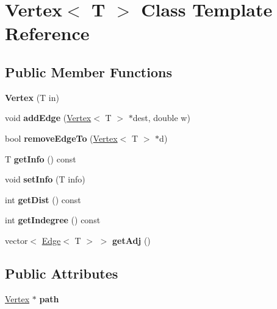 \hypertarget{class_vertex}{}\section{Vertex$<$ T $>$ Class Template Reference}
\label{class_vertex}
\subsection*{Public Member Functions}
\begin{DoxyCompactItemize}
\item 
\mbox{\label{class_vertex_afcbdd4d4198b672356559cb8fa088408}} 
{\bfseries Vertex} (T in)
\item 
\mbox{\label{class_vertex_aeb024eced2da142912f189af6a454db3}} 
void {\bfseries add\+Edge} (\hyperlink{class_vertex}{Vertex}$<$ T $>$ $\ast$dest, double w)
\item 
\mbox{\label{class_vertex_ab2b5b43fb1709a901b78718436763a84}} 
bool {\bfseries remove\+Edge\+To} (\hyperlink{class_vertex}{Vertex}$<$ T $>$ $\ast$d)
\item 
\mbox{\label{class_vertex_a48eae2f7af2362634adab02b7b2dbec6}} 
T {\bfseries get\+Info} () const
\item 
\mbox{\label{class_vertex_a31cd60c26640f8072a928ba70eb2f95e}} 
void {\bfseries set\+Info} (T info)
\item 
\mbox{\label{class_vertex_a645a81161bc9f70ebfda8e292b91c24b}} 
int {\bfseries get\+Dist} () const
\item 
\mbox{\label{class_vertex_ac78980191ea1f9d22e6617e9e511b755}} 
int {\bfseries get\+Indegree} () const
\item 
\mbox{\label{class_vertex_a2041d7304d627508a34fb2630135caaa}} 
vector$<$ \hyperlink{class_edge}{Edge}$<$ T $>$ $>$ {\bfseries get\+Adj} ()
\end{DoxyCompactItemize}
\subsection*{Public Attributes}
\begin{DoxyCompactItemize}
\item 
\mbox{\label{class_vertex_abd40febd917aa25add6bd42237c8463a}} 
\hyperlink{class_vertex}{Vertex} $\ast$ {\bfseries path}
\end{DoxyCompactItemize}
